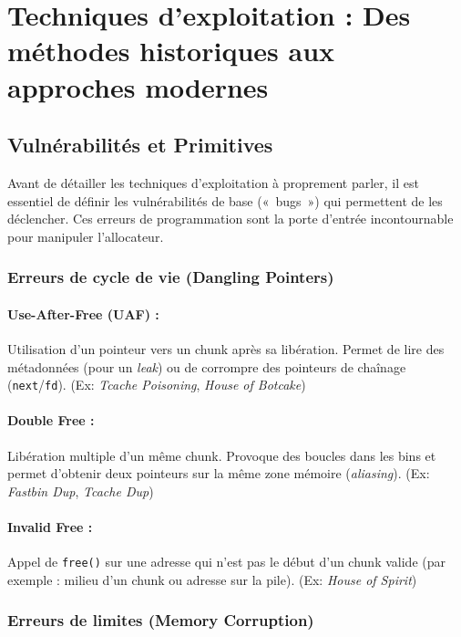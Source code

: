 \section{Techniques d'exploitation : Des méthodes historiques aux approches modernes}

\subsection{Vulnérabilités et Primitives}

Avant de détailler les techniques d'exploitation à proprement parler, il est essentiel de définir les vulnérabilités de base («~bugs~») qui permettent de les déclencher. Ces erreurs de programmation sont la porte d'entrée incontournable pour manipuler l'allocateur.

\subsubsection{Erreurs de cycle de vie (Dangling Pointers)}

\paragraph{Use-After-Free (UAF) :} Utilisation d'un pointeur vers un chunk après sa libération. Permet de lire des métadonnées (pour un \textit{leak}) ou de corrompre des pointeurs de chaînage (\texttt{next}/\texttt{fd}). (Ex: \textit{Tcache Poisoning}, \textit{House of Botcake})

\paragraph{Double Free :} Libération multiple d'un même chunk. Provoque des boucles dans les bins et permet d'obtenir deux pointeurs sur la même zone mémoire (\textit{aliasing}). (Ex: \textit{Fastbin Dup}, \textit{Tcache Dup})

\paragraph{Invalid Free :} Appel de \texttt{free()} sur une adresse qui n'est pas le début d'un chunk valide (par exemple : milieu d'un chunk ou adresse sur la pile). (Ex: \textit{House of Spirit})

\subsubsection{Erreurs de limites (Memory Corruption)}

